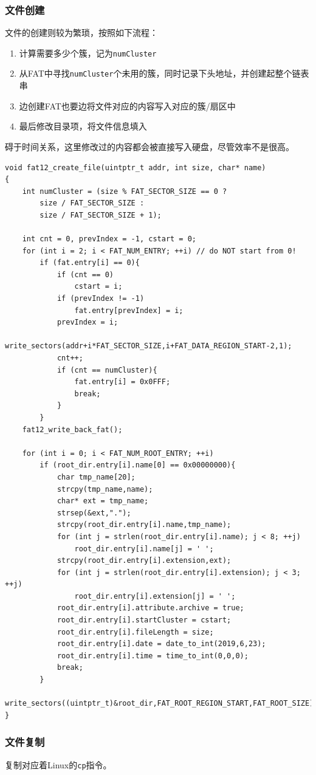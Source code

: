 \documentclass[logo,reportComp]{thesis}
\begin{document}
\subsubsection{文件创建}
文件的创建则较为繁琐，按照如下流程：
\begin{enumerate}
	\item 计算需要多少个簇，记为\verb'numCluster'
	\item 从FAT中寻找\verb'numCluster'个未用的簇，同时记录下头地址，并创建起整个链表串
	\item 边创建FAT也要边将文件对应的内容写入对应的簇/扇区中
	\item 最后修改目录项，将文件信息填入
\end{enumerate}
碍于时间关系，这里修改过的内容都会被直接写入硬盘，尽管效率不是很高。
\begin{lstlisting}
void fat12_create_file(uintptr_t addr, int size, char* name)
{
	int numCluster = (size % FAT_SECTOR_SIZE == 0 ?
		size / FAT_SECTOR_SIZE :
		size / FAT_SECTOR_SIZE + 1);

	int cnt = 0, prevIndex = -1, cstart = 0;
	for (int i = 2; i < FAT_NUM_ENTRY; ++i) // do NOT start from 0!
		if (fat.entry[i] == 0){
			if (cnt == 0)
				cstart = i;
			if (prevIndex != -1)
				fat.entry[prevIndex] = i;
			prevIndex = i;
			write_sectors(addr+i*FAT_SECTOR_SIZE,i+FAT_DATA_REGION_START-2,1);
			cnt++;
			if (cnt == numCluster){
				fat.entry[i] = 0x0FFF;
				break;
			}
		}
	fat12_write_back_fat();

	for (int i = 0; i < FAT_NUM_ROOT_ENTRY; ++i)
		if (root_dir.entry[i].name[0] == 0x00000000){
			char tmp_name[20];
			strcpy(tmp_name,name);
			char* ext = tmp_name;
			strsep(&ext,".");
			strcpy(root_dir.entry[i].name,tmp_name);
			for (int j = strlen(root_dir.entry[i].name); j < 8; ++j)
				root_dir.entry[i].name[j] = ' ';
			strcpy(root_dir.entry[i].extension,ext);
			for (int j = strlen(root_dir.entry[i].extension); j < 3; ++j)
				root_dir.entry[i].extension[j] = ' ';
			root_dir.entry[i].attribute.archive = true;
			root_dir.entry[i].startCluster = cstart;
			root_dir.entry[i].fileLength = size;
			root_dir.entry[i].date = date_to_int(2019,6,23);
			root_dir.entry[i].time = time_to_int(0,0,0);
			break;
		}
	write_sectors((uintptr_t)&root_dir,FAT_ROOT_REGION_START,FAT_ROOT_SIZE);
}
\end{lstlisting}

\subsubsection{文件复制}
复制对应着Linux的\verb'cp'指令。
\end{document}
